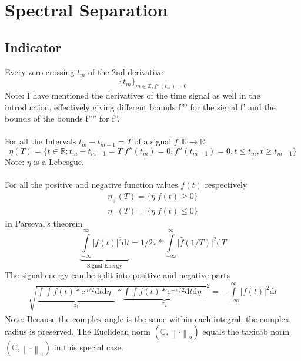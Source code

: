 \documentclass{report}
\newcommand\norm[1]{\left\lVert#1\right\rVert}
\begin{document}
\chapter{Spectral Separation}
\section{Indicator}
Every zero crossing $t_{m}$ of the 2nd derivative
\begin{equation}
\{t_{m}\}_{m \in \mathbb{Z} , f''(t_{m})=0}
\end{equation}
Note: I have mentioned the derivatives of the time signal as well in the introduction, effectively giving different bounds f''' for the signal f' and the bounds of the bounds f'''' for f''.\\\\
For all the Intervals $t_{m}-t_{m-1}=T$ of a signal $f: \mathbb{R} \rightarrow \mathbb{R}$
\begin{equation}
\eta(T)=\{t \in \mathbb{R}; t_{m} - t_{m-1}=T \vert f''(t_{m})=0, f''(t_{m-1})=0, t \le t_{m}, t \ge t_{m-1} \}
\end{equation}
Note: $\eta$ is a Lebesgue.\\\\
For all the positive and negative function values $f(t)$ respectively
\begin{align}
\eta_{+}(T)=\{{\eta \vert f(t) \ge 0}\}\\
\eta_{-}(T)=\{{\eta \vert f(t) \le 0}\}
\end{align}
In Parseval's theorem
\begin{equation}
\underbrace{\int\limits_{-\infty}^{\infty} \vert f(t) \vert ^2 \mathrm{d} t}_{\text{Signal Energy}} = 1/2\pi * \int\limits_{-\infty}^{\infty} \vert \hat{f}(1/T) \vert ^2  \mathrm{d} T
\end{equation}
The signal energy can be split into positive and negative parts
\begin{align}
\sqrt{\underbrace{\int \int f(t)*\mathrm{e}^{\pi/2} \mathrm{d} t \mathrm{d} \eta_{+}}_{z_{1}}*\underbrace{\int \int f(t) *\mathrm{e}^{-\pi/2}\mathrm{d} t \mathrm{d} \eta_{-} }_{z_{2}} } ^2 = - \int\limits_{-\infty}^{\infty} \vert f(t) \vert ^2 \mathrm{d} t 
\end{align}
Note: Because the complex angle is the same within each integral, the complex radius is preserved. The Euclidean norm $(\mathbb{C},\norm{\cdot}_2)$ equals the taxicab norm $(\mathbb{C},\norm{\cdot}_1)$ in this special case.\\\\
\end{document}

